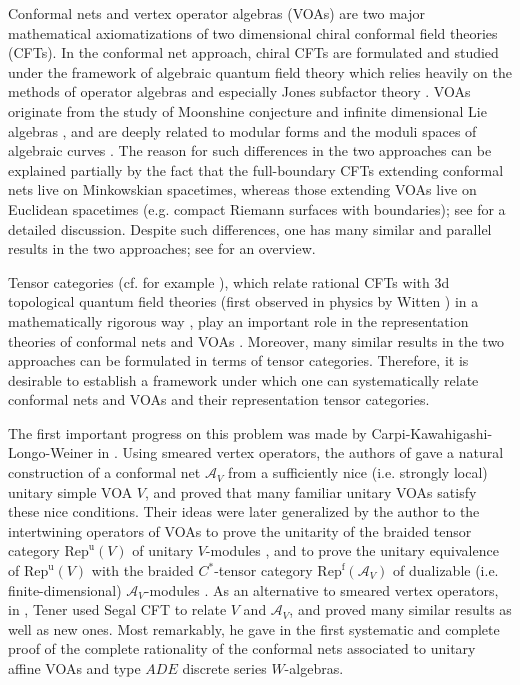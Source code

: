 \documentclass[11pt,b5paper,notitlepage]{article}
\theoremstyle{definition}
\theoremstyle{plain}
\newcommand{\mc}{\mathcal}
\newcommand{\Repf}{\mathrm{Rep}^{\mathrm f}}
\newcommand{\RepuV}{\mathrm{Rep}^{\mathrm u}(V)}
\numberwithin{equation}{subsection}
\begin{document}
Conformal nets and vertex operator algebras (VOAs) are two major mathematical axiomatizations of two dimensional chiral conformal field theories (CFTs). In the conformal net approach, chiral CFTs are formulated and studied under the framework of algebraic quantum field theory \cite{HK64,Haag96} which relies heavily on the methods of operator algebras and especially  Jones subfactor theory \cite{Jon83,Lon89,Lon90}. VOAs originate from the study of Moonshine conjecture and infinite dimensional Lie algebras \cite{FLM89,Bor92}, and are deeply related to modular forms \cite{Zhu96} and the moduli spaces of algebraic curves \cite{TUY89,FB04,DGT19a,DGT19b}. The reason for such  differences in the two approaches can be explained partially by the fact that the full-boundary CFTs extending conformal nets live on Minkowskian spacetimes, whereas those extending VOAs live on Euclidean spacetimes (e.g. compact Riemann surfaces with boundaries); see \cite{KR08} for a detailed discussion. Despite such differences, one has many similar and parallel results in the two approaches; see  \cite{Kaw15,Kaw18} for an overview.



Tensor categories (cf. for example \cite{BK01,EGNO15}), which relate rational CFTs with 3d topological quantum field theories (first observed in physics by Witten \cite{Wit89}) in a mathematically rigorous way \cite{Tur94}, play an important role in the representation theories of conformal nets \cite{FRS89,FRS92,KLM01} and VOAs \cite{Hua05a,NT05,Hua08b}. Moreover, many similar results in the two approaches can be formulated in terms of tensor categories. Therefore, it is desirable to establish a framework under which one can systematically relate conformal nets and VOAs and their representation tensor categories.

The first important progress on this problem  was made by Carpi-Kawahigashi-Longo-Weiner in \cite{CKLW18}. Using smeared vertex operators, the authors of \cite{CKLW18} gave a natural construction of a conformal net $\mc A_V$ from a sufficiently nice (i.e. strongly local) unitary simple VOA $V$, and proved that many familiar unitary VOAs satisfy these nice conditions. Their ideas were later generalized by the author to the intertwining operators of VOAs to prove the unitarity of the braided tensor category $\RepuV$ of unitary $V$-modules \cite{Gui19a,Gui19b,Gui19c}, and to prove the unitary equivalence of $\RepuV$ with the braided $C^*$-tensor category $\Repf(\mc A_V)$ of dualizable (i.e. finite-dimensional) $\mc A_V$-modules \cite{Gui21a}. As an alternative to smeared vertex operators, in \cite{Ten19a,Ten19b,Ten24}, Tener used Segal CFT \cite{Seg04,Ten17}  to relate $V$ and $\mc A_V$, and proved many similar results as well as new ones. Most remarkably, he gave in \cite{Ten24}  the first systematic and complete proof of the complete rationality of the conformal nets associated to unitary affine VOAs and type $ADE$ discrete series $W$-algebras.
\end{document}
